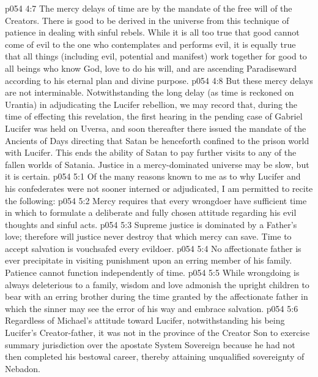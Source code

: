\vs p054 4:7 The mercy delays of time are by the mandate of the free will of the Creators. There is good to be derived in the universe from this technique of patience in dealing with sinful rebels. While it is all too true that good cannot come of evil to the one who contemplates and performs evil, it is equally true that all things (including evil, potential and manifest) work together for good to all beings who know God, love to do his will, and are ascending Paradiseward according to his eternal plan and divine purpose.
\vs p054 4:8 But these mercy delays are not interminable. Notwithstanding the long delay (as time is reckoned on Urantia) in adjudicating the Lucifer rebellion, we may record that, during the time of effecting this revelation, the first hearing in the pending case of Gabriel  Lucifer was held on Uversa, and soon thereafter there issued the mandate of the Ancients of Days directing that Satan be henceforth confined to the prison world with Lucifer. This ends the ability of Satan to pay further visits to any of the fallen worlds of Satania. Justice in a mercy\hyp{}dominated universe may be slow, but it is certain.
\vs p054 5:1 Of the many reasons known to me as to why Lucifer and his confederates were not sooner interned or adjudicated, I am permitted to recite the following:
\vs p054 5:2 \bibnobreakspace Mercy requires that every wrongdoer have sufficient time in which to formulate a deliberate and fully chosen attitude regarding his evil thoughts and sinful acts.
\vs p054 5:3 \bibnobreakspace Supreme justice is dominated by a Father’s love; therefore will justice never destroy that which mercy can save. Time to accept salvation is vouchsafed every evildoer.
\vs p054 5:4 \bibnobreakspace No affectionate father is ever precipitate in visiting punishment upon an erring member of his family. Patience cannot function independently of time.
\vs p054 5:5 \bibnobreakspace While wrongdoing is always deleterious to a family, wisdom and love admonish the upright children to bear with an erring brother during the time granted by the affectionate father in which the sinner may see the error of his way and embrace salvation.
\vs p054 5:6 \bibnobreakspace Regardless of Michael’s attitude toward Lucifer, notwithstanding his being Lucifer’s Creator\hyp{}father, it was not in the province of the Creator Son to exercise summary jurisdiction over the apostate System Sovereign because he had not then completed his bestowal career, thereby attaining unqualified sovereignty of Nebadon.
